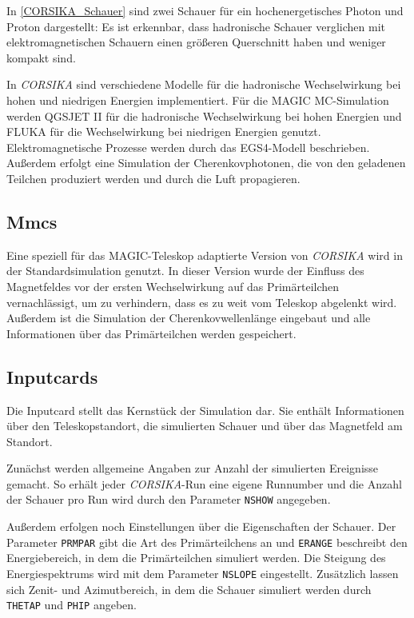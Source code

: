 In \autoref{CORSIKA_Schauer} sind zwei Schauer für ein hochenergetisches Photon und Proton dargestellt: 
Es ist erkennbar, dass hadronische Schauer verglichen mit elektromagnetischen Schauern einen größeren Querschnitt haben und weniger kompakt sind.

In \textit{CORSIKA} sind verschiedene Modelle für die hadronische Wechselwirkung bei hohen und niedrigen Energien implementiert.
Für die MAGIC MC-Simulation werden QGSJET II für die hadronische Wechselwirkung bei hohen Energien und FLUKA für die Wechselwirkung bei niedrigen Energien genutzt.
Elektromagnetische Prozesse werden durch das EGS4-Modell beschrieben.
Außerdem erfolgt eine Simulation der Cherenkovphotonen, die von den geladenen Teilchen produziert werden und durch die Luft propagieren.

\subsection{Mmcs}
Eine speziell für das MAGIC-Teleskop adaptierte Version von \textit{CORSIKA} wird in der Standardsimulation genutzt.
In dieser Version wurde der Einfluss des Magnetfeldes vor der ersten Wechselwirkung auf das Primärteilchen vernachlässigt, um zu verhindern, dass es zu weit vom Teleskop abgelenkt wird.
Außerdem ist die Simulation der Cherenkovwellenlänge eingebaut und alle Informationen über das Primärteilchen werden gespeichert.

\subsection{Inputcards}
Die Inputcard stellt das Kernstück der Simulation dar.
Sie enthält Informationen über den Teleskopstandort, die simulierten Schauer und über das Magnetfeld am Standort.

Zunächst werden allgemeine Angaben zur Anzahl der simulierten Ereignisse gemacht. 
So erhält jeder \textit{CORSIKA}-Run eine eigene Runnumber und die Anzahl der Schauer pro Run wird durch den Parameter \texttt{NSHOW} angegeben.

Außerdem erfolgen noch Einstellungen über die Eigenschaften der Schauer.
Der Parameter \texttt{PRMPAR} gibt die Art des Primärteilchens an und \texttt{ERANGE} beschreibt den Energiebereich, in dem die Primärteilchen simuliert werden.
Die Steigung des Energiespektrums wird mit dem Parameter \texttt{NSLOPE} eingestellt.
Zusätzlich lassen sich Zenit- und Azimutbereich, in dem die Schauer simuliert werden durch \texttt{THETAP} und \texttt{PHIP} angeben.

